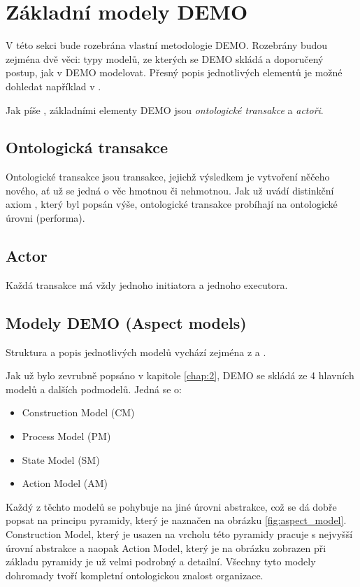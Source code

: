 \section{Základní modely DEMO}
V této sekci bude rozebrána vlastní metodologie DEMO. Rozebrány budou zejména dvě věci: typy modelů, ze kterých se DEMO skládá a doporučený postup, jak v DEMO modelovat. Přesný popis jednotlivých elementů je možné dohledat například v \cite{Dietz2006}.

Jak píše \cite{Vejrazkova2012}, základními elementy DEMO jsou \textit{ontologické transakce} a \textit{actoři}.

\subsection{Ontologická transakce}
Ontologické transakce jsou transakce, jejichž výsledkem je vytvoření něčeho nového, ať už se jedná o věc hmotnou či nehmotnou. Jak už uvádí distinkční axiom \ptheory{}, který byl popsán výše, ontologické transakce probíhají na ontologické úrovni (performa).

\subsection{Actor}
Každá transakce má vždy jednoho initiatora a jednoho executora.

\subsection{Modely DEMO (Aspect models)}
Struktura a popis jednotlivých modelů vychází zejména z \cite{Vejrazkova2012} a \cite{Dietz2005}.

Jak už bylo zevrubně popsáno v kapitole \ref{chap:2}, DEMO se skládá ze 4 hlavních modelů a dalších podmodelů. Jedná se o:

\begin{itemize}
\item Construction Model (CM)
\item Process Model (PM)
\item State Model (SM)
\item Action Model (AM)
\end{itemize}

Každý z těchto modelů se pohybuje na jiné úrovni abstrakce, což se dá dobře popsat na principu pyramidy, který je naznačen na obrázku \ref{fig:aspect_model}.
Construction Model, který je usazen na vrcholu této pyramidy pracuje s nejvyšší úrovní abstrakce a naopak Action Model, který je na obrázku zobrazen při základu pyramidy je už velmi podrobný a detailní. Všechny tyto modely dohromady tvoří kompletní ontologickou znalost organizace.

